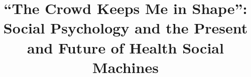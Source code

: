 \documentclass{www13-companion-accepted}
\begin{document}
%

\title{``The Crowd Keeps Me in Shape'': Social Psychology and the Present and Future of Health Social Machines}
%
%
%
%
%
\end{document}
